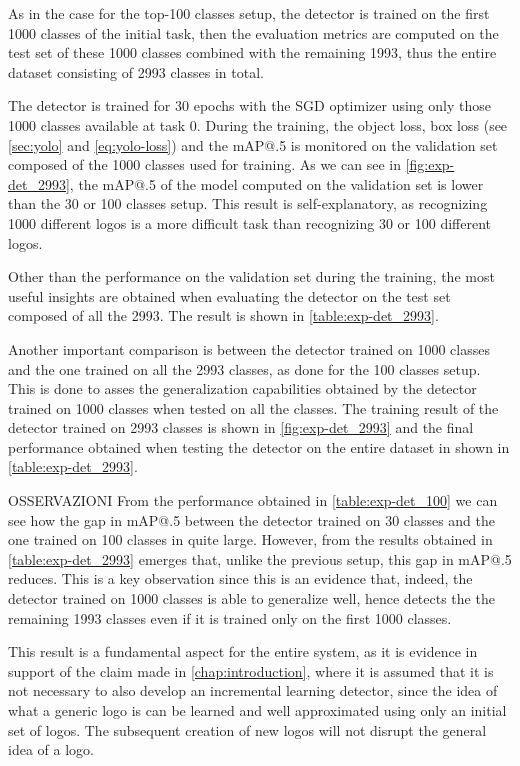 As in the case for the top-100 classes setup, the detector is trained on the first 1000 classes of the initial task, then the evaluation metrics are computed on the test set of these 1000 classes combined with the remaining 1993, thus the entire dataset consisting of 2993 classes in total.

The detector is trained for 30 epochs with the SGD optimizer using only those 1000 classes available at task 0.
During the training, the object loss, box loss (see \autoref{sec:yolo} and \autoref{eq:yolo-loss}) and the mAP@.5 is monitored on the validation set composed of the 1000 classes used for training.
As we can see in \autoref{fig:exp-det_2993}, the mAP@.5 of the model computed on the validation set is lower than the 30 or 100 classes setup.
This result is self-explanatory, as recognizing 1000 different logos is a more difficult task than recognizing 30 or 100 different logos.

Other than the performance on the validation set during the training, the most useful insights are obtained when evaluating the detector on the test set composed of all the 2993. The result is shown in \autoref{table:exp-det_2993}.

Another important comparison is between the detector trained on 1000 classes and the one trained on all the 2993 classes, as done for the 100 classes setup.
This is done to asses the generalization capabilities obtained by the detector trained on 1000 classes when tested on all the classes. The training result of the detector trained on 2993 classes is shown in \autoref{fig:exp-det_2993} and the final performance obtained when testing the detector on the entire dataset in shown in \autoref{table:exp-det_2993}.

OSSERVAZIONI
From the performance obtained in \autoref{table:exp-det_100} we can see how the gap in mAP@.5 between the detector trained on 30 classes and the one trained on 100 classes in quite large. However, from the results obtained in \autoref{table:exp-det_2993} emerges that, unlike the previous setup, this gap in mAP@.5 reduces. This is a key observation since this is an evidence that, indeed, the detector trained on 1000 classes is able to generalize well, hence detects the the remaining 1993 classes even if it is trained only on the first 1000 classes.

This result is a fundamental aspect for the entire system, as it is evidence in support of the claim made in \autoref{chap:introduction}, where it is assumed that it is not necessary to also develop an incremental learning detector, since the idea of what a generic logo is can be learned and well approximated using only an initial set of logos. The subsequent creation of new logos will not disrupt the general idea of a logo.

